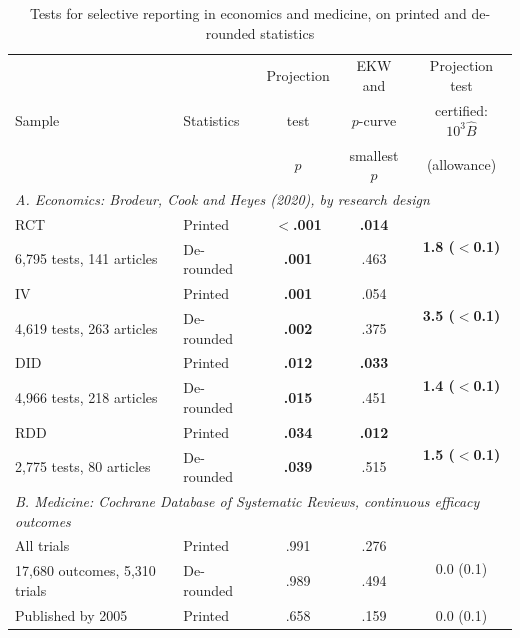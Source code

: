 \begin{table}[!htbp]\centering
\begin{threeparttable}
\caption{Tests for selective reporting in economics and medicine, on printed and de-rounded statistics}
\label{tab:main_applications_nokudrin}
\begin{tabular}{llccc}
\toprule
 & & Projection & EKW and & Projection test \\
Sample & Statistics & test & $p$-curve & certified: $10^3 \hat B$ \\
 & & $p$ & smallest $p$ & (allowance) \\
\midrule
\multicolumn{5}{l}{\textit{A. Economics: Brodeur, Cook and Heyes (2020), by research design}} \\
RCT & Printed & \textbf{$<$.001} & \textbf{.014} & \multirow{2}{*}{\textbf{1.8 ($<$0.1)}} \\
{\footnotesize 6,795 tests, 141 articles} & De-rounded & \textbf{.001} & .463 & \\
\addlinespace[2pt]
IV & Printed & \textbf{.001} & .054 & \multirow{2}{*}{\textbf{3.5 ($<$0.1)}} \\
{\footnotesize 4,619 tests, 263 articles} & De-rounded & \textbf{.002} & .375 & \\
\addlinespace[2pt]
DID & Printed & \textbf{.012} & \textbf{.033} & \multirow{2}{*}{\textbf{1.4 ($<$0.1)}} \\
{\footnotesize 4,966 tests, 218 articles} & De-rounded & \textbf{.015} & .451 & \\
\addlinespace[2pt]
RDD & Printed & \textbf{.034} & \textbf{.012} & \multirow{2}{*}{\textbf{1.5 ($<$0.1)}} \\
{\footnotesize 2,775 tests,  80 articles} & De-rounded & \textbf{.039} & .515 & \\
\midrule
\multicolumn{5}{l}{\textit{B. Medicine: Cochrane Database of Systematic Reviews, continuous efficacy outcomes}} \\
All trials & Printed & .991 & .276 & \multirow{2}{*}{0.0 (0.1)} \\
{\footnotesize 17,680 outcomes, 5,310 trials} & De-rounded & .989 & .494 & \\
\addlinespace[2pt]
Published by 2005 & Printed & .658 & .159 & \multirow{2}{*}{0.0 (0.1)} \\

\end{tabular}
\end{threeparttable}
\end{table}
